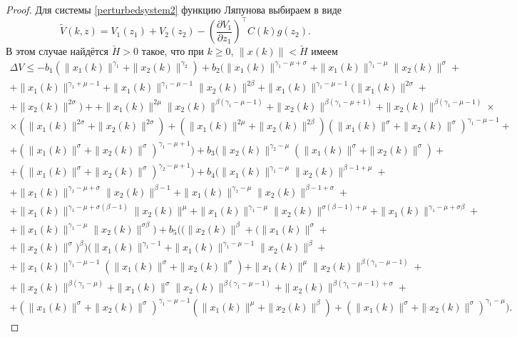 \begin{proof}
Для системы \eqref{perturbedsystem2} функцию Ляпунова выбираем в виде
$$
{\widetilde V}(k,z)=V_1(z_1)+V_2(z_2)- \left(\frac{\partial
V_1}{\partial z_1}\right)^\top  C(k)g(z_2).
$$
В этом случае найдётся $\breve{H}>0$
такое, что при $k\geq 0$, $\|x(k)\|<\breve{H}$ имеем
\begin{multline*}
\Delta V\leq-b_1\left(\|x_1(k)\|^{\gamma_1}+
\|x_2(k)\|^{\gamma_2}\right)+b_2\Big(\|x_1(k)\|^{\gamma_1-\mu+\sigma}+\|x_1(k)\|^{\gamma_1-\mu}\|x_2(k)\|^{\sigma}+\\
+\|x_1(k)\|^{\gamma_1+\mu-1}+\|x_1(k)\|^{\gamma_1-\mu-1}\|x_2(k)\|^{2\beta}+\|x_1(k)\|^{\gamma_1-\mu-1}
(\|x_1(k)\|^{2\sigma}+\\
+\|x_2(k)\|^{2\sigma})+
+\|x_1(k)\|^{2\mu}\|x_2(k)\|^{\beta(\gamma_1-\mu-1)}+\|x_2(k)\|^{\beta(\gamma_1-\mu+1)}+
\|x_2(k)\|^{\beta(\gamma_1-\mu-1)} \times\\
\times (\|x_1(k)\|^{2\sigma}+\|x_2(k)\|^{2\sigma})+
(\|x_1(k)\|^{2\mu}+\|x_2(k)\|^{2\beta})(\|x_1(k)\|^{\sigma}+\|x_2(k)\|^{\sigma})^{\gamma_1-\mu-1}+\\
+(\|x_1(k)\|^{\sigma}+\|x_2(k)\|^{\sigma})^{\gamma_1-\mu+1}\Big)+
b_3\Big(\|x_2(k)\|^{\gamma_2-\mu}(\|x_1(k)\|^{\sigma}+\|x_2(k)\|^{\sigma})+\\
+(\|x_1(k)\|^{\sigma}+\|x_2(k)\|^{\sigma})^{\gamma_2-\mu+1}\Big)+
b_4\Big(
\|x_1(k)\|^{\gamma_1-\mu}\|x_2(k)\|^{\beta-1+\mu}+\\
+\|x_1(k)\|^{\gamma_1-\mu+\sigma}\|x_2(k)\|^{\beta-1}+\|x_1(k)\|^{\gamma_1-\mu}\|x_2(k)\|^{\beta-1+\sigma}+\\
+\|x_1(k)\|^{\gamma_1-\mu+\sigma(\beta-1)}\|x_2(k)\|^{\mu}+
\|x_1(k)\|^{\gamma_1-\mu}\|x_2(k)\|^{\sigma(\beta-1)+\mu}+\|x_1(k)\|^{\gamma_1-\mu+\sigma\beta}+\\
+\|x_1(k)\|^{\gamma_1-\mu}\|x_2(k)\|^{\sigma\beta}\Big)+b_5\Big(\big(\|x_2(k)\|^{\beta}+(\|x_1(k)\|^{\sigma}+\\
+\|x_2(k)\|^{\sigma})^\beta\big)(\|x_1(k)\|^{\gamma_1-1}+
\|x_1(k)\|^{\gamma_1-\mu-1}\|x_2(k)\|^{\beta}+\\
+\|x_1(k)\|^{\gamma_1-\mu-1}(\|x_1(k)\|^{\sigma}+\|x_2(k)\|^{\sigma})+\|x_1(k)\|^{\mu}\|x_2(k)\|^{\beta(\gamma_1-\mu-1)}+\\
+\|x_2(k)\|^{\beta(\gamma_1-\mu)}+\|x_1(k)\|^{\sigma}\|x_2(k)\|^{\beta(\gamma_1-\mu-1)}+
\|x_2(k)\|^{\beta(\gamma_1-\mu-1)+\sigma}+\\
+(\|x_1(k)\|^{\sigma}+\|x_2(k)\|^{\sigma})^{\gamma_1-\mu-1}(\|x_1(k)\|^{\mu}+\|x_2(k)\|^{\beta})+(\|x_1(k)\|^{\sigma}+\|x_2(k)\|^{\sigma})^{\gamma_1-\mu}\Big).
\end{multline*}


\end{proof}
